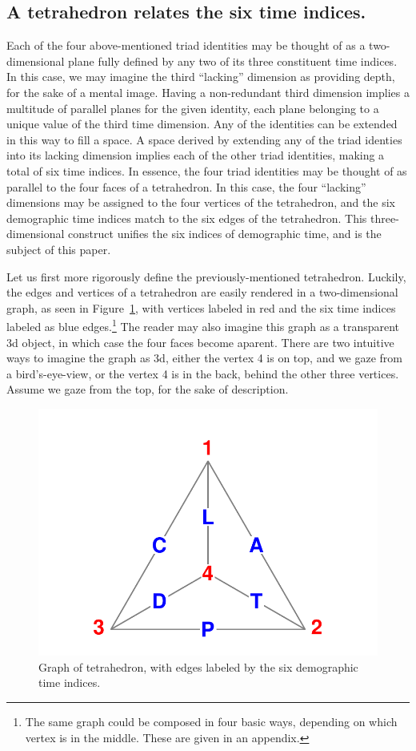 \documentclass[11pt,oneside,a4paper]{article} %
\newcommand\vt[1]{\textcolor{rd}{#1}}
\begin{document}
\subsection*{A tetrahedron relates the six time indices.}
Each of the four above-mentioned triad identities may be thought of as a
two-dimensional plane fully defined by any two of its three constituent time
indices.
In this case, we may imagine the third ``lacking'' dimension as providing
depth, for the sake of a mental image.
Having a non-redundant third dimension implies a multitude of parallel planes
for the given identity, each plane belonging to a unique value of the third time dimension. Any of the
identities can be extended in this way to fill a space. A space derived by
extending any of the triad identies into its lacking dimension implies each of the
other triad identities, making a total of six time indices. In essence, the
four triad identities may be thought of as parallel to the four faces of a
tetrahedron. In this case, the four ``lacking'' dimensions may be assigned to
the four vertices of the tetrahedron, and the six demographic time indices match
to the six edges of the tetrahedron. This three-dimensional construct
unifies the six indices of demographic time, and is the subject of this paper.

Let us first more rigorously define the previously-mentioned tetrahedron.
Luckily, the edges and vertices of a tetrahedron are easily rendered in a
two-dimensional graph, as seen in Figure~\ref{fig:tet}, with vertices labeled
in red and the six time indices labeled as blue edges.\footnote{The same graph
could be composed in four basic ways, depending on which vertex is in the
middle. These are given in an appendix.} The reader may also imagine this graph
as a transparent 3d object, in which case the four faces become aparent. There are two intuitive ways to imagine the graph as 3d, either the vertex \vt{4} is on top, and we gaze from a bird's-eye-view, or the
vertex \vt{4} is in the back, behind the other three vertices. Assume we
gaze from the top, for the sake of description. 

\begin{figure}[h!]
\centering
\caption{Graph of tetrahedron, with edges labeled by the six demographic time
indices.}
\label{fig:tet}
\includegraphics[scale=1]{Figures/TetraHedronVerticesEdges.pdf}
\end{figure}
\end{document}
